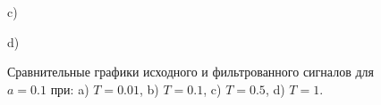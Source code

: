 \documentclass[a5paper, 10pt]{article}
\theoremstyle{definition}
\theoremstyle{plain}
\theoremstyle{remark}
\begin{document}
\begin{figure}[h!]
\begin{minipage}[h!]{0.47\linewidth}
 c) \\
\end{minipage}
\hfill
\begin{minipage}[h!]{0.47\linewidth}
 d) \\
\end{minipage}
\caption{Сравнительные графики исходного и фильтрованного сигналов для $a=0.1$ при: a) $T=0.01$, b)
$T=0.1$, c) $T=0.5$, d) $T=1$.}
\end{figure}
\end{document}
